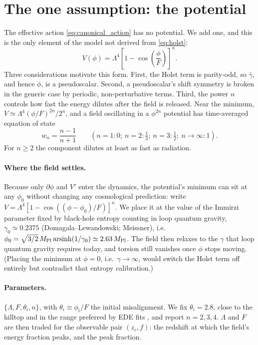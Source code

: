 \documentclass[11pt]{article}
\newcommand{\Mp}{M_{\rm Pl}}
\begin{document}
\section{The one assumption: the potential}\label{sec:potential}
The effective action \eqref{eq:canonical_action} has no potential. We add one, and this is
the only element of the model not derived from \eqref{eq:holst}:
\begin{equation}
V(\phi)=\Lambda^4\left[1-\cos\!\left(\frac{\phi}{F}\right)\right]^n .
\label{eq:V}
\end{equation}
Three considerations motivate this form. First, the Holst term is parity-odd, so
$\bar\gamma$, and hence $\phi$, is a pseudoscalar. Second, a pseudoscalar's shift
symmetry is broken in the generic case by periodic, non-perturbative terms. Third,
the power $n$ controls how fast the energy dilutes after the field is released. Near
the minimum, $V\simeq\Lambda^4(\phi/F)^{2n}/2^n$, and a field oscillating in a
$\phi^{2n}$ potential has time-averaged equation of state \cite{turner1983}
\begin{equation}
w_n=\frac{n-1}{n+1}\qquad(n=1:0;\ n=2:\tfrac13;\ n=3:\tfrac12;\ n\to\infty:1).
\label{eq:wn}
\end{equation}
For $n\ge2$ the component dilutes at least as fast as radiation.

\paragraph{Where the field settles.} Because only $\partial\phi$ and $V'$ enter the
dynamics, the potential's minimum can sit at any $\phi_0$ without changing any
cosmological prediction: write $V=\Lambda^4[1-\cos((\phi-\phi_0)/F)]^n$. We place it at the
value of the Immirzi parameter fixed by black-hole entropy counting in loop quantum
gravity, $\gamma_0\simeq0.2375$ (Domagala--Lewandowski; Meissner), i.e.\
$\phi_0=\sqrt{3/2}\,\Mp\,\mathrm{arsinh}(1/\gamma_0)\simeq2.63\,\Mp$. The field then relaxes
to the $\gamma$ that loop quantum gravity requires today, and torsion still vanishes once
$\phi$ stops moving. (Placing the minimum at $\phi=0$, i.e.\ $\gamma\to\infty$, would switch
the Holst term off entirely but contradict that entropy calibration.)

\paragraph{Parameters.} $\{\Lambda,F,\theta_i,n\}$, with
$\theta_i\equiv\phi_i/F$ the initial misalignment. We fix $\theta_i=2.8$, close to the
hilltop and in the range preferred by EDE fits \cite{poulin2019}, and report
$n=2,3,4$. $\Lambda$ and $F$ are then traded for the observable pair
$(z_c,f)$: the redshift at which the field's energy fraction peaks, and the peak fraction.
\end{document}
